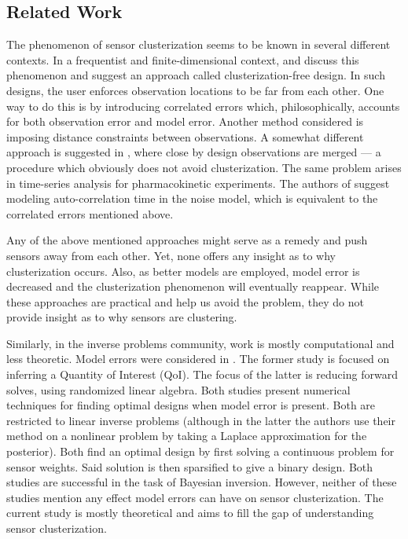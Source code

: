 \documentclass{amsart}
\numberwithin{equation}{section}
\begin{document}
\subsection{Related Work}
The phenomenon of sensor clusterization seems to be known in several
different contexts. In a frequentist and finite-dimensional context,
\cite{Fedorov96} and \cite[chapter 2.4.3]{Ucinski05} discuss this
phenomenon and suggest an approach called clusterization-free design.
In such designs, the user enforces observation locations to be far
from each other. One way to do this is by introducing correlated
errors which, philosophically, accounts for both observation error and
model error. Another method considered is imposing distance
constraints between observations. A somewhat different approach is
suggested in \cite[page 49]{Fedorov12}, where close by design
observations are merged --- a procedure which obviously does not avoid
clusterization. The same problem arises in time-series analysis for
pharmacokinetic experiments. The authors of \cite{Hooker09} suggest
modeling auto-correlation time in the noise model, which is equivalent
to the correlated errors mentioned above.

Any of the above mentioned approaches might serve as a remedy and push
sensors away from each other. Yet, none offers any insight as to why
clusterization occurs. Also, as better models are employed, model
error is decreased and the clusterization phenomenon will eventually
reappear. While these approaches are practical and help us avoid the
problem, they do not provide insight as to why sensors are clustering.

Similarly, in the inverse problems community, work is mostly
computational and less theoretic. Model errors were considered in
\cite{Attia20, Koval20}. The former study is focused on inferring a
Quantity of Interest (QoI). The focus of the latter is reducing
forward solves, using randomized linear algebra. Both studies present
numerical techniques for finding optimal designs when model error is
present. Both are restricted to linear inverse problems (although in
the latter the authors use their method on a nonlinear problem by
taking a Laplace approximation for the posterior). Both find an
optimal design by first solving a continuous problem for sensor
weights. Said solution is then sparsified to give a binary
design. Both studies are successful in the task of Bayesian
inversion. However, neither of these studies mention any effect model
errors can have on sensor clusterization. The current study is mostly
theoretical and aims to fill the gap of understanding sensor
clusterization.
\end{document}
